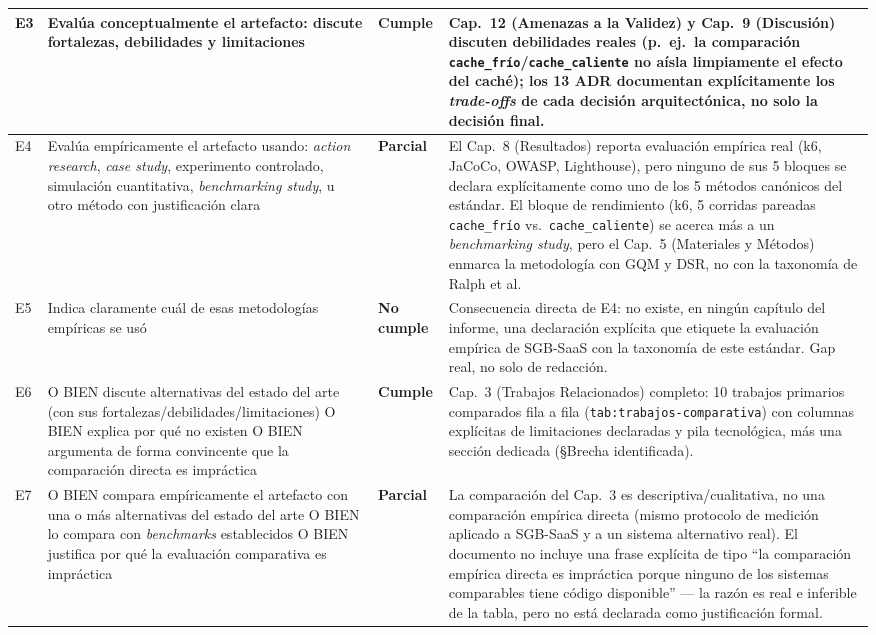 \begin{center}
\begin{longtable}{|p{0.7cm}|p{4.2cm}|p{1.6cm}|p{7.0cm}|}
\hline
E3 & Evalúa conceptualmente el artefacto: discute fortalezas, debilidades y limitaciones & \textbf{Cumple} & Cap.\ 12 (Amenazas a la Validez) y Cap.\ 9 (Discusión) discuten debilidades reales (p.\ ej.\ la comparación \texttt{cache\_frío}/\texttt{cache\_caliente} no aísla limpiamente el efecto del caché); los 13 ADR documentan explícitamente los \emph{trade-offs} de cada decisión arquitectónica, no solo la decisión final. \\
\hline
E4 & Evalúa empíricamente el artefacto usando: \emph{action research}, \emph{case study}, experimento controlado, simulación cuantitativa, \emph{benchmarking study}, u otro método con justificación clara & \textbf{Parcial} & El Cap.\ 8 (Resultados) reporta evaluación empírica real (k6, JaCoCo, OWASP, Lighthouse), pero ninguno de sus 5 bloques se declara explícitamente como uno de los 5 métodos canónicos del estándar. El bloque de rendimiento (k6, 5 corridas pareadas \texttt{cache\_frío} vs.\ \texttt{cache\_caliente}) se acerca más a un \emph{benchmarking study}, pero el Cap.\ 5 (Materiales y Métodos) enmarca la metodología con GQM y DSR, no con la taxonomía de Ralph et al. \\
\hline
E5 & Indica claramente cuál de esas metodologías empíricas se usó & \textbf{No cumple} & Consecuencia directa de E4: no existe, en ningún capítulo del informe, una declaración explícita que etiquete la evaluación empírica de SGB-SaaS con la taxonomía de este estándar. Gap real, no solo de redacción. \\
\hline
E6 & O BIEN discute alternativas del estado del arte (con sus fortalezas/debilidades/limitaciones) O BIEN explica por qué no existen O BIEN argumenta de forma convincente que la comparación directa es impráctica & \textbf{Cumple} & Cap.\ 3 (Trabajos Relacionados) completo: 10 trabajos primarios comparados fila a fila (\texttt{tab:trabajos-comparativa}) con columnas explícitas de limitaciones declaradas y pila tecnológica, más una sección dedicada (§Brecha identificada). \\
\hline
E7 & O BIEN compara empíricamente el artefacto con una o más alternativas del estado del arte O BIEN lo compara con \emph{benchmarks} establecidos O BIEN justifica por qué la evaluación comparativa es impráctica & \textbf{Parcial} & La comparación del Cap.\ 3 es descriptiva/cualitativa, no una comparación empírica directa (mismo protocolo de medición aplicado a SGB-SaaS y a un sistema alternativo real). El documento no incluye una frase explícita de tipo ``la comparación empírica directa es impráctica porque ninguno de los sistemas comparables tiene código disponible'' --- la razón es real e inferible de la tabla, pero no está declarada como justificación formal. \\

\end{longtable}
\end{center}
